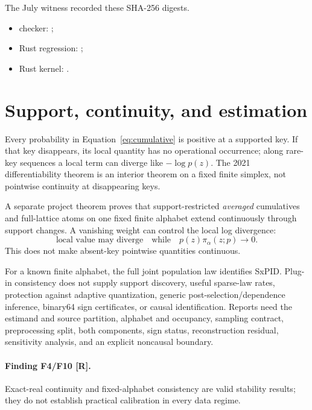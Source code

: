 \documentclass[11pt]{article}
\newcommand{\evidence}[1]{\textbf{[#1]}}
\begin{document}
The July witness recorded these SHA-256 digests.
\begin{itemize}
\small
  \item checker:
        ;
  \item Rust regression:
        ;
  \item Rust kernel:
        .
\end{itemize}

\section{Support, continuity, and estimation}

Every probability in Equation~\eqref{eq:cumulative} is positive at a supported
key.  If that key disappears, its local quantity has no operational occurrence;
along rare-key sequences a local term can diverge like $-\log p(z)$.  The 2021
differentiability theorem is an interior theorem on a fixed finite simplex, not
pointwise continuity at disappearing keys.

A separate project theorem proves that support-restricted \emph{averaged}
cumulatives and full-lattice atoms on one fixed finite alphabet extend
continuously through support changes.  A vanishing weight can control the local
log divergence:
\[
\text{local value may diverge}
\quad\text{while}\quad p(z)\pi_\alpha(z;p)\longrightarrow0.
\]
This does not make absent-key pointwise quantities continuous.

For a known finite alphabet, the full joint population law identifies SxPID\@.
Plug-in consistency does not supply support discovery, useful sparse-law rates,
protection against adaptive quantization, generic post-selection/dependence
inference, binary64 sign certificates, or causal identification.  Reports need
the estimand and source partition, alphabet and occupancy, sampling contract,
preprocessing split, both components, sign status, reconstruction residual,
sensitivity analysis, and an explicit noncausal boundary.

\paragraph{Finding F4/F10 \evidence{R}.}
Exact-real continuity and fixed-alphabet consistency are valid stability
results; they do not establish practical calibration in every data regime.
\end{document}
